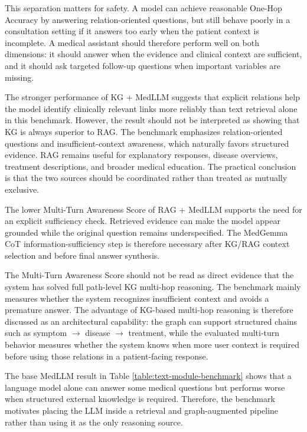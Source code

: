 This separation matters for safety. A model can achieve reasonable One-Hop Accuracy by answering relation-oriented questions, but still behave poorly in a consultation setting if it answers too early when the patient context is incomplete. A medical assistant should therefore perform well on both dimensions: it should answer when the evidence and clinical context are sufficient, and it should ask targeted follow-up questions when important variables are missing.

The stronger performance of KG + MedLLM suggests that explicit relations help the model identify clinically relevant links more reliably than text retrieval alone in this benchmark. However, the result should not be interpreted as showing that KG is always superior to RAG. The benchmark emphasizes relation-oriented questions and insufficient-context awareness, which naturally favors structured evidence. RAG remains useful for explanatory responses, disease overviews, treatment descriptions, and broader medical education. The practical conclusion is that the two sources should be coordinated rather than treated as mutually exclusive.

The lower Multi-Turn Awareness Score of RAG + MedLLM supports the need for an explicit sufficiency check. Retrieved evidence can make the model appear grounded while the original question remains underspecified. The MedGemma CoT information-sufficiency step is therefore necessary after KG/RAG context selection and before final answer synthesis.

The Multi-Turn Awareness Score should not be read as direct evidence that the system has solved full path-level KG multi-hop reasoning. The benchmark mainly measures whether the system recognizes insufficient context and avoids a premature answer. The advantage of KG-based multi-hop reasoning is therefore discussed as an architectural capability: the graph can support structured chains such as symptom $\rightarrow$ disease $\rightarrow$ treatment, while the evaluated multi-turn behavior measures whether the system knows when more user context is required before using those relations in a patient-facing response.

The base MedLLM result in Table \ref{table:text-module-benchmark} shows that a language model alone can answer some medical questions but performs worse when structured external knowledge is required. Therefore, the benchmark motivates placing the LLM inside a retrieval and graph-augmented pipeline rather than using it as the only reasoning source.

